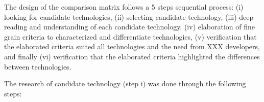 


The design of the comparison matrix follows a 5 steps sequential process: (i) looking for candidate technologies, (ii) selecting candidate technology, (iii) deep reading and understanding of each candidate technology, (iv) elaboration of fine grain criteria to characterized and differentiate technologies, (v) verification that the elaborated criteria suited all technologies and the need from XXX developers, and finally (vi) verification that the elaborated criteria highlighted the differences between technologies.

The research of candidate technology (step i) was done through the following steps:

